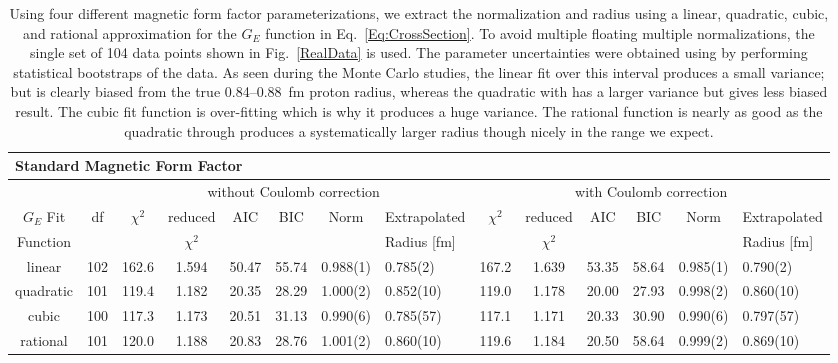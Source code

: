 \documentclass[10pt,aps,prc,twocolumn]{revtex4-1}
\begin{document}
\begin{table}
\caption{Using four different magnetic form factor parameterizations, we extract the normalization
and radius using a linear, quadratic, cubic, and rational approximation for the $G_E$ function in 
Eq.~\ref{Eq:CrossSection}.
To avoid multiple floating multiple normalizations, the single set of 104 data points 
shown in Fig.~\ref{RealData} is used.
The parameter uncertainties were obtained using by performing statistical bootstraps of the data.
As seen during the Monte Carlo studies, the linear fit over this interval produces a small variance; 
but is clearly biased from the true 0.84--0.88~fm proton radius, whereas the quadratic with has a 
larger variance but gives less biased result.   The cubic fit function is over-fitting which is 
why it produces a huge variance.   The rational function is nearly as good as the quadratic through
produces a systematically larger radius though nicely in the range we expect.}
\begin{tabular}{cc|cccccl|cccccl}                                                  \hline \hline
\multicolumn{14}{l}{Standard Magnetic Form Factor}                                 \\ \hline
          &     & \multicolumn{6}{c}{without Coulomb correction}                 & \multicolumn{6}{|c}{with Coulomb correction} \\
$G_E$ Fit & df  & $\chi^2$ & reduced   & AIC    & BIC    & Norm      & Extrapolated & $\chi^2$ & reduced   & AIC    & BIC    & Norm      & Extrapolated      \\  
Function  &     &          & $\chi^2$  &        &        &           & Radius [fm]      &          & $\chi^2$  &        &        &           & Radius [fm]        \\ \hline
linear    & 102 & 162.6    & 1.594     & 50.47  & 55.74  & 0.988(1)  & 0.785(2)  & 167.2    & 1.639     & 53.35  & 58.64  & 0.985(1)  & 0.790(2)    \\
quadratic & 101 & 119.4    & 1.182     & 20.35  & 28.29  & 1.000(2)  & 0.852(10) & 119.0    & 1.178     & 20.00  & 27.93  & 0.998(2)  & 0.860(10)   \\
cubic     & 100 & 117.3    & 1.173     & 20.51  & 31.13  & 0.990(6)  & 0.785(57) & 117.1    & 1.171     & 20.33  & 30.90  & 0.990(6)  & 0.797(57)   \\    
rational  & 101 & 120.0    & 1.188     & 20.83  & 28.76  & 1.001(2)  & 0.860(10) & 119.6    & 1.184     & 20.50  & 58.64  & 0.999(2)  & 0.869(10)   \\ \hline \hline

\end{tabular}
\end{table}
\end{document}
